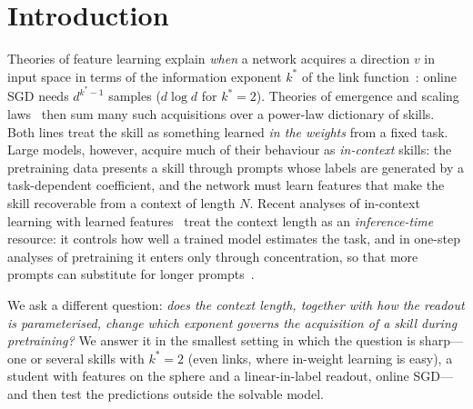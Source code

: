 \section{Introduction}
\label{sec:intro}
Theories of feature learning explain \emph{when} a network acquires a direction $v$ in input space in terms of the information
exponent $k^*$ of the link function~\citep{benarous2021online}: online SGD needs $d^{k^*-1}$ samples ($d\log d$ for $k^*=2$). Theories of
emergence and scaling laws~\citep{michaud2023quantization,nam2024exactly,ren2025emergence} then sum many such acquisitions over
a power-law dictionary of skills. Both lines treat the skill as something learned \emph{in the weights} from a fixed task. Large
models, however, acquire much of their behaviour as \emph{in-context} skills: the pretraining data presents a skill through
prompts whose labels are generated by a task-dependent coefficient, and the network must learn features that make the skill
recoverable from a context of length $N$. Recent analyses of in-context learning with learned features~\citep{oko2024pretrained,
nishikawa2025nonlinear,kim2024transformers,gu2026incontext} treat the context length as an \emph{inference-time} resource: it
controls how well a trained model estimates the task, and in one-step analyses of pretraining it enters only through
concentration, so that more prompts can substitute for longer prompts~\citep[Remark~3]{oko2024pretrained}.

We ask a different question: \emph{does the context length, together with how the readout is parameterised, change which
exponent governs the acquisition of a skill during pretraining?} We answer it in the smallest setting in which the question is
sharp---one or several skills with $k^*=2$ (even links, where in-weight learning is easy), a student with features on the sphere
and a linear-in-label readout, online SGD---and then test the predictions outside the solvable model.


